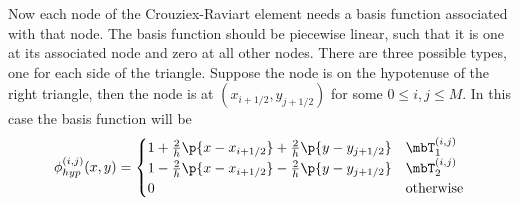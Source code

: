 \documentclass[11pt, titlepage]{article}
\begin{document}
\begin{enumerate}
\begin{enumerate}
        Now each node of the Crouziex-Raviart element needs a basis function
        associated with that node.
        The basis function should be piecewise linear, such that it is one
        at its associated node and zero at all other nodes.
        There are three possible types, one for each side of the triangle.
        Suppose the node is on the hypotenuse of the right triangle, then
        the node is at $(x_{i+1/2}, y_{j+1/2})$ for some $0 \le i, j \le M$.
        In this case the basis function will be
        \[
          \phi^{(i, j)}_{hyp}(x, y) =
          \begin{cases}
            1 + \frac{2}{h}\p{x - x_{i+1/2}} + \frac{2}{h}\p{y - y_{j+1/2}} & \mbT^{(i, j)}_1 \\
            1 - \frac{2}{h}\p{x - x_{i+1/2}} - \frac{2}{h}\p{y - y_{j+1/2}} & \mbT^{(i, j)}_2 \\
            0 & \text{otherwise}
          \end{cases}
        \]


\end{enumerate}
\end{enumerate}
\end{document}
